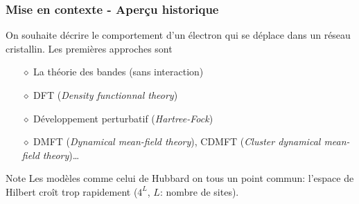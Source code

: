 
\begin{frame}
    \begin{center}
    \vspace{0.5cm}
    \end{center}
\end{frame}

\begin{frame}
    \frametitle{Mise en contexte - Aperçu historique}
    On souhaite décrire le comportement d'un électron qui se déplace dans
    un réseau cristallin. Les premières approches sont
    \vspace{0.3cm}
    \begin{itemize}
        \pause
        \item[$\diamond$] La théorie des bandes (sans interaction)
        \pause
        \item[$\diamond$] DFT (\textit{Density functionnal theory})
        \pause
        \item[$\diamond$] Développement perturbatif (\textit{Hartree-Fock})
        \pause
    \item[$\diamond$] DMFT (\textit{Dynamical mean-field theory}), CDMFT (\textit{Cluster dynamical mean-field theory})\dots
    \end{itemize}
    \vfill
    \pause
    \begin{noteblock}{Note}
        Les modèles comme celui de Hubbard on tous un point commun:
        l'espace de Hilbert croît trop rapidement ($4^L$, $L$: nombre de sites).
    \end{noteblock}
\end{frame}
